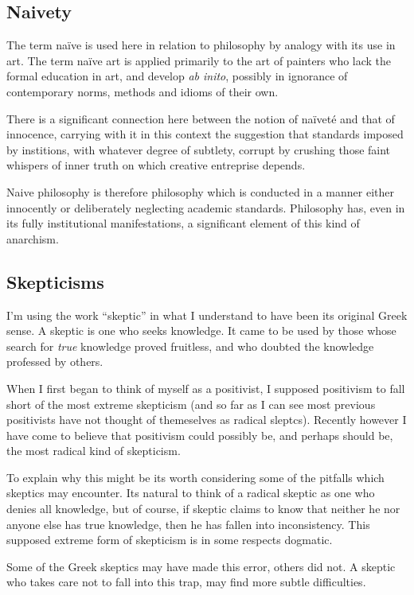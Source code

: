 \documentclass{rbjk}
\begin{document}
\begin{article}
\subsection{Naivety}

The term na\"ive is used here in relation to philosophy by analogy with its use in art.
The term na\"ive art is applied primarily to the art of painters who lack the formal education in art, and develop {\it ab inito}, possibly in ignorance of contemporary norms, methods and idioms of their own.

There is a significant connection here between the notion of na\"ivet\'e and that of innocence, carrying with it in this context the suggestion that standards imposed by institions, with whatever degree of subtlety, corrupt by crushing those faint whispers of inner truth on which creative entreprise depends.

Naive philosophy is therefore philosophy which is conducted in a manner either innocently or deliberately neglecting academic standards.
Philosophy has, even in its fully institutional manifestations, a significant element of this kind of anarchism.



\subsection{Skepticisms}

I'm using the work ``skeptic'' in what I understand to have been its original Greek sense.
A skeptic is one who seeks knowledge.
It came to be used by those whose search for {\it true} knowledge proved fruitless, and who doubted the knowledge professed by others.

When I first began to think of myself as a positivist, I supposed positivism to fall short of the most extreme skepticism (and so far as I can see most previous positivists have not thought of themeselves as radical sleptcs).
Recently however I have come to believe that positivism could possibly be, and perhaps should be, the most radical kind of skepticism.

To explain why this might be its worth considering some of the pitfalls which skeptics may encounter.
Its natural to think of a radical skeptic as one who denies all knowledge, but of course, if skeptic claims to know that neither he nor anyone else has true knowledge, then he has fallen into inconsistency.
This supposed extreme form of skepticism is in some respects dogmatic.

Some of the Greek skeptics may have made this error, others did not.
A skeptic who takes care not to fall into this trap, may find more subtle difficulties.


\end{article}
\end{document}
